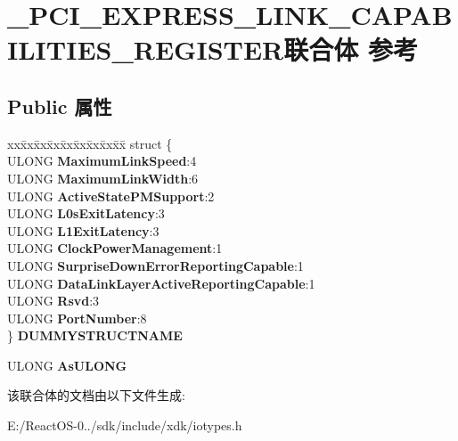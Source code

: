 \hypertarget{union___p_c_i___e_x_p_r_e_s_s___l_i_n_k___c_a_p_a_b_i_l_i_t_i_e_s___r_e_g_i_s_t_e_r}{}\section{\+\_\+\+P\+C\+I\+\_\+\+E\+X\+P\+R\+E\+S\+S\+\_\+\+L\+I\+N\+K\+\_\+\+C\+A\+P\+A\+B\+I\+L\+I\+T\+I\+E\+S\+\_\+\+R\+E\+G\+I\+S\+T\+E\+R联合体 参考}
\label{union___p_c_i___e_x_p_r_e_s_s___l_i_n_k___c_a_p_a_b_i_l_i_t_i_e_s___r_e_g_i_s_t_e_r}
\subsection*{Public 属性}
\begin{DoxyCompactItemize}
\item 
\mbox{\label{union___p_c_i___e_x_p_r_e_s_s___l_i_n_k___c_a_p_a_b_i_l_i_t_i_e_s___r_e_g_i_s_t_e_r_ade7f41e64a46f40d786287b9e2917afb}} 
\begin{tabbing}
xx\=xx\=xx\=xx\=xx\=xx\=xx\=xx\=xx\=\kill
struct \{\\
\>ULONG {\bfseries MaximumLinkSpeed}:4\\
\>ULONG {\bfseries MaximumLinkWidth}:6\\
\>ULONG {\bfseries ActiveStatePMSupport}:2\\
\>ULONG {\bfseries L0sExitLatency}:3\\
\>ULONG {\bfseries L1ExitLatency}:3\\
\>ULONG {\bfseries ClockPowerManagement}:1\\
\>ULONG {\bfseries SurpriseDownErrorReportingCapable}:1\\
\>ULONG {\bfseries DataLinkLayerActiveReportingCapable}:1\\
\>ULONG {\bfseries Rsvd}:3\\
\>ULONG {\bfseries PortNumber}:8\\
\} {\bfseries DUMMYSTRUCTNAME}\\

\end{tabbing}\item 
\mbox{\label{union___p_c_i___e_x_p_r_e_s_s___l_i_n_k___c_a_p_a_b_i_l_i_t_i_e_s___r_e_g_i_s_t_e_r_ad10fcf6433e81e849bf7a85bc9dbc17e}} 
U\+L\+O\+NG {\bfseries As\+U\+L\+O\+NG}
\end{DoxyCompactItemize}


该联合体的文档由以下文件生成\+:\begin{DoxyCompactItemize}
\item 
E\+:/\+React\+O\+S-\/0../sdk/include/xdk/iotypes.\+h\end{DoxyCompactItemize}
